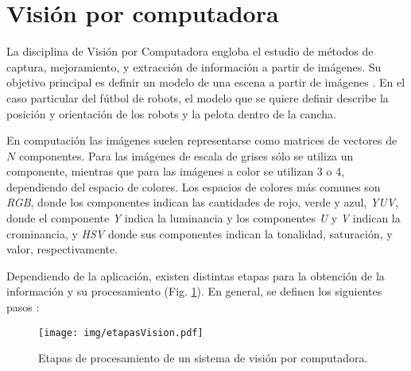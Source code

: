 
\section{Visión por computadora}

\label{mt_visionComputadora}

La disciplina de Visión por Computadora engloba el estudio de métodos de
captura, mejoramiento, y extracción de información a partir de imágenes. Su
objetivo principal es definir un modelo de una escena a partir de
imágenes \cite{cvLinda2001}. En el caso particular del fútbol de robots, el
modelo que se quiere definir describe la posición y orientación de los robots y
la pelota dentro de la cancha.

En computación las imágenes suelen representarse como matrices de vectores de
$N$ componentes. Para las imágenes de escala de grises sólo se utiliza un
componente, mientras que para las imágenes a color se utilizan 3 o 4,
dependiendo del espacio de colores. Los espacios de colores más comunes son
\emph{RGB}, donde los componentes indican las cantidades de rojo, verde y
azul, \emph{YUV}, donde el componente \emph{Y} indica la luminancia y los
componentes \emph{U} y \emph{V} indican la crominancia, y \emph{HSV} donde sus
componentes indican la tonalidad, saturación, y valor, respectivamente.

Dependiendo de la aplicación, existen distintas etapas para la obtención de la
información y su procesamiento (Fig. \ref{etapasVision}). En general, se definen los
siguientes pasos \cite{digitalImageProcessing2ed,wikiCV}:

\begin{figure}[!htb]

	\centering
	\texttt{[image: img/etapasVision.pdf]}
	\caption{Etapas de procesamiento de un sistema de visión por
	computadora.}

	\label{etapasVision}

\end{figure}

